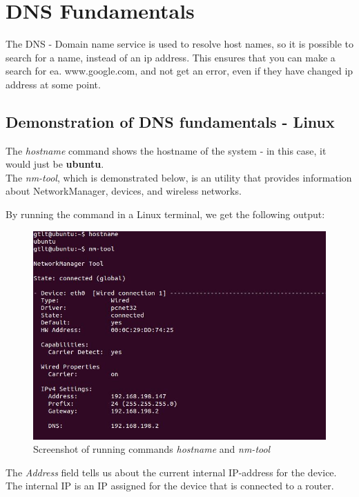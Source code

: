 \section{DNS Fundamentals}

The DNS - Domain name service  is used to resolve host names, so it is possible to search for a name, instead of an ip address. This ensures that you can make a search for ea. www.google.com, and not get an error, even if they have changed ip address at some point.

\subsection{Demonstration of DNS fundamentals - Linux}

The \textit{hostname} command shows the hostname of the system - in this case, it would just be \textbf{ubuntu}.\\

The \textit{nm-tool}, which is demonstrated below, is an utility that provides information about NetworkManager, devices, and wireless networks. 

By running the command in a Linux terminal, we get the following output:

\begin{figure}[ht!]
\centering
\includegraphics[width=150mm]{img/nm-tool.png}
\caption{Screenshot of running commands \textit{hostname} and \textit{nm-tool}}
\label{nm-tool}
\end{figure}

The \textit{Address} field tells us about the current internal IP-address for the device. The internal IP is an IP assigned for the device that is connected to a router. \\

